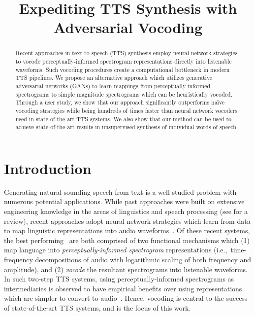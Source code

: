 \documentclass[a4paper]{article}
\title{Expediting TTS Synthesis with Adversarial Vocoding}
\begin{document}
\maketitle
% 
\begin{abstract}
Recent approaches in text-to-speech (TTS) synthesis employ neural network strategies to vocode perceptually-informed spectrogram representations directly into listenable waveforms. 
Such vocoding procedures create a computational bottleneck in modern TTS pipelines. 
We propose an alternative approach which utilizes generative adversarial networks (GANs) to learn mappings from perceptually-informed spectrograms to simple magnitude spectrograms which can be heuristically vocoded. 
Through a user study, we show that our approach significantly outperforms na\"ive vocoding strategies while being hundreds of times faster than neural network vocoders used in state-of-the-art TTS systems. 
We also show that our method can be used to achieve state-of-the-art results in unsupervised synthesis of individual words of speech.
\end{abstract}


\section{Introduction}

Generating natural-sounding speech from text is a well-studied problem with numerous potential applications. 
While past approaches were built on extensive engineering knowledge in the areas of linguistics and speech processing (see \cite{zen2009statistical} for a review), 
recent approaches adopt neural network strategies which learn from data to map linguistic representations into audio waveforms~\cite{arik2017deep,gibiansky2017deep,ping2017deep,wang2017tacotron,shen2018natural}. 
Of these recent systems, 
the best performing~\cite{ping2017deep,shen2018natural} are both comprised of two functional mechanisms which 
(1) map language into \emph{perceptually-informed spectrogram} representations (i.e.,~time-frequency decompositions of audio with logarithmic scaling of both frequency and amplitude), and 
(2) \emph{vocode} the resultant spectrograms into listenable waveforms. 
In such two-step TTS systems, 
using perceptually-informed spectrograms as intermediaries is observed to have empirical benefits over using representations which are simpler to convert to audio~\cite{ping2017deep}. 
Hence, vocoding is central to the success of state-of-the-art TTS systems, and is the focus of this work.
\end{document}
